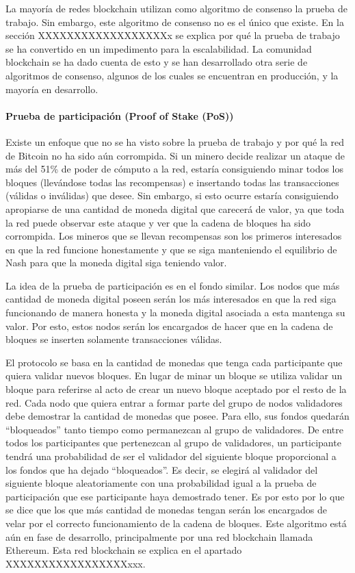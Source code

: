 La mayoría de redes blockchain utilizan como algoritmo de consenso la prueba de trabajo. Sin embargo, este algoritmo de consenso no es el único que existe. En la sección XXXXXXXXXXXXXXXXXXx se explica por qué la prueba de trabajo se ha convertido en un impedimento para la escalabilidad. La comunidad blockchain se ha dado cuenta de esto y se han desarrollado otra serie de algoritmos de consenso, algunos de los cuales se encuentran en producción, y la mayoría en desarrollo.

\paragraph{Prueba de participación (Proof of Stake (PoS))}
Existe un enfoque que no se ha visto sobre la prueba de trabajo y por qué la red de Bitcoin no ha sido aún corrompida. Si un minero decide realizar un ataque de más del 51\% de poder de cómputo a la red, estaría consiguiendo minar todos los bloques (llevándose todas las recompensas) e insertando todas las transacciones (válidas o inválidas) que desee. Sin embargo, si esto ocurre estaría consiguiendo apropiarse de una cantidad de moneda digital que carecerá de valor, ya que toda la red puede observar este ataque y ver que la cadena de bloques ha sido corrompida. Los mineros que se llevan recompensas son los primeros interesados en que la red funcione honestamente y que se siga manteniendo el equilibrio de Nash para que la moneda digital siga teniendo valor. \newline

La idea de la prueba de participación es en el fondo similar. Los nodos que más cantidad de moneda digital poseen serán los más interesados en que la red siga funcionando de manera honesta y la moneda digital asociada a esta mantenga su valor. Por esto, estos nodos serán los encargados de hacer que en la cadena de bloques se inserten solamente transacciones válidas. \newline

El protocolo se basa en la cantidad de monedas que tenga cada participante que quiera validar nuevos bloques. En lugar de minar un bloque se utiliza validar un bloque para referirse al acto de crear un nuevo bloque aceptado por el resto de la red. Cada nodo que quiera entrar a formar parte del grupo de nodos validadores debe demostrar la cantidad de monedas que posee. Para ello, sus fondos quedarán “bloqueados” tanto tiempo como permanezcan al grupo de validadores. De entre todos los participantes que pertenezcan al grupo de validadores, un participante tendrá una probabilidad de ser el validador del siguiente bloque proporcional a los fondos que ha dejado “bloqueados”. Es decir, se elegirá al validador del siguiente bloque aleatoriamente con una probabilidad igual a la prueba de participación que ese participante haya demostrado tener. Es por esto por lo que se dice que los que más cantidad de monedas tengan serán los encargados de velar por el correcto funcionamiento de la cadena de bloques.
Este algoritmo está aún en fase de desarrollo, principalmente por una red blockchain llamada Ethereum. Esta red blockchain se explica en el apartado XXXXXXXXXXXXXXXXXxxx.

